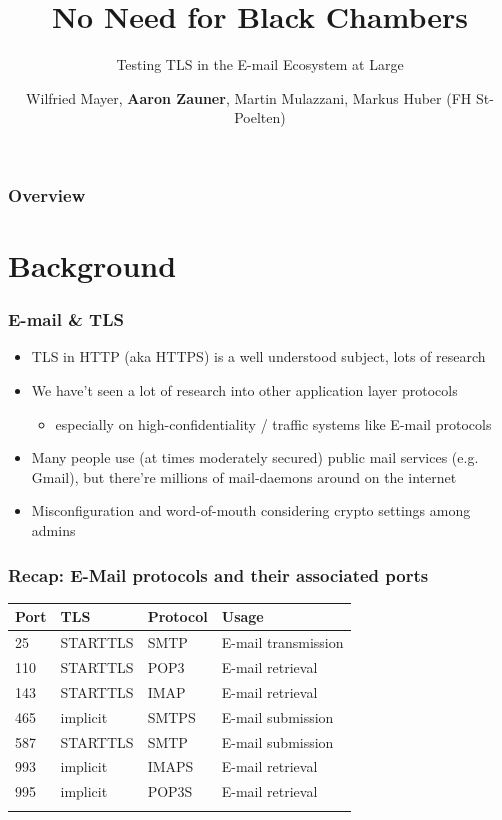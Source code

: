 \documentclass[14pt,aspectratio=43]{beamer}
\title{No Need for Black Chambers}
\subtitle{Testing TLS in the E-mail Ecosystem at Large}
\author{Wilfried Mayer, \textbf{Aaron Zauner}, Martin Mulazzani, Markus Huber (FH St-Poelten)}
\begin{document}
\maketitle


\begin{frame}
  \frametitle{Overview}
  \tableofcontents
\end{frame}

\section{Background}
\sectionpage

\begin{frame}
  \frametitle{E-mail \& TLS}
  \begin{itemize}
    \item TLS in HTTP (aka HTTPS) is a well understood subject, lots of research
    \item We have't seen a lot of research into other application layer protocols
    \begin{itemize}
      \item especially on high-confidentiality / traffic systems like E-mail protocols
    \end{itemize}
    \item Many people use (at times moderately secured) public mail services (e.g. Gmail), but there're millions of mail-daemons around on the internet
    \item Misconfiguration and word-of-mouth considering crypto settings among admins
  \end{itemize}
\end{frame}

\begin{frame}
  \frametitle{Recap: E-Mail protocols and their associated ports}

\begin{table}
    \begin{center}
    \begin{tabular}{llll}
        \hline
        Port \hspace{0.05cm} & TLS  \hspace{0.05cm} & Protocol  \hspace{0.05cm} & Usage \\
        \hline
        25 & STARTTLS & SMTP & E-mail transmission \\
        110 & STARTTLS & POP3 & E-mail retrieval \\
        143 & STARTTLS & IMAP & E-mail retrieval \\
        465 & implicit & SMTPS & E-mail submission\\
        587 & STARTTLS & SMTP & E-mail submission \\
        993 & implicit & IMAPS & E-mail retrieval \\
        995 & implicit & POP3S & E-mail retrieval \\
    \hline \\
    \end{tabular}
    \label{tbl:emailPorts}
    \end{center}
\end{table}
\end{frame}
\end{document}
